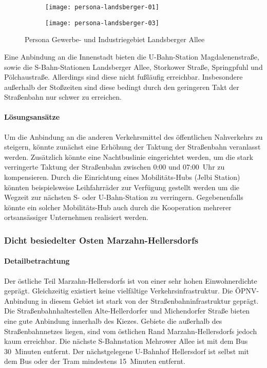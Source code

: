 \begin{figure}
    \centering
    \begin{subfigure}{.5\textwidth}
        \centering
        \texttt{[image: persona-landsberger-01]}
    \end{subfigure}%
    \begin{subfigure}{.5\textwidth}
        \centering
        \texttt{[image: persona-landsberger-03]}
    \end{subfigure}
    \caption{Persona Gewerbe- und Industriegebiet Landsberger Allee}
    \label{persona-landsberger-allee}
\end{figure}

Eine Anbindung an die Innenstadt bieten die U-Bahn-Station Magdalenenstraße, sowie die S-Bahn-Stationen Landsberger Allee, Storkower Straße, Springpfuhl und Pölchaustraße. Allerdings sind diese nicht fußläufig erreichbar. Insbesondere außerhalb der Stoßzeiten sind diese bedingt durch den geringeren Takt der Straßenbahn nur schwer zu erreichen.

\paragraph{Lösungsansätze}

Um die Anbindung an die anderen Verkehrsmittel des öffentlichen Nahverkehrs zu steigern, könnte zunächst eine Erhöhung der Taktung der Straßenbahn veranlasst werden. Zusätzlich könnte eine Nachtbuslinie eingerichtet werden, um die stark verringerte Taktung der Straßenbahn zwischen 0:00 und 07:00~Uhr zu kompensieren. Durch die Einrichtung eines Mobilitäts-Hubs (Jelbi Station) könnten beispielsweise Leihfahrräder zur Verfügung gestellt werden um die Wegzeit zur nächsten S- oder U-Bahn-Station zu verringern. Gegebenenfalls könnte ein solcher Mobilitäts-Hub auch durch die Kooperation mehrerer ortsansässiger Unternehmen realisiert werden.

\subsubsection{Dicht besiedelter Osten Marzahn-Hellersdorfs}

\paragraph{Detailbetrachtung}

Der östliche Teil Marzahn-Hellersdorfs ist von einer sehr hohen Einwohnerdichte geprägt. Gleichzeitig existiert keine vielfältige Verkehrsinfrastruktur. Die ÖPNV-Anbindung in diesem Gebiet ist stark von der Straßenbahninfrastruktur geprägt. Die Straßenbahnhaltestellen Alte-Hellerdorfer und Michendorfer Straße bieten eine gute Anbindung innerhalb des Kiezes. Gebiete die außerhalb des Straßenbahnnetzes liegen, sind vom östlichen Rand Marzahn-Hellersdorfs jedoch kaum erreichbar. Die nächste S-Bahnstation Mehrower Allee ist mit dem Bus 30~Minuten entfernt. Der nächstgelegene U-Bahnhof Hellersdorf ist selbst mit dem Bus oder der Tram mindestens 15~Minuten entfernt.

